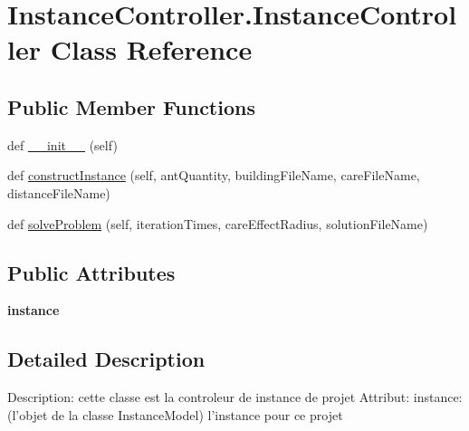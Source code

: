 \hypertarget{class_instance_controller_1_1_instance_controller}{}\section{Instance\+Controller.\+Instance\+Controller Class Reference}
\label{class_instance_controller_1_1_instance_controller}
\subsection*{Public Member Functions}
\begin{DoxyCompactItemize}
\item 
def \mbox{\hyperlink{class_instance_controller_1_1_instance_controller_a03bb3fbe1839d3b293f52105f8af0165}{\+\_\+\+\_\+init\+\_\+\+\_\+}} (self)
\item 
def \mbox{\hyperlink{class_instance_controller_1_1_instance_controller_aabe70fc23070b14aef590f99ac1c6296}{construct\+Instance}} (self, ant\+Quantity, building\+File\+Name, care\+File\+Name, distance\+File\+Name)
\item 
def \mbox{\hyperlink{class_instance_controller_1_1_instance_controller_a73f6a84881bc711978453e1af10fbb15}{solve\+Problem}} (self, iteration\+Times, care\+Effect\+Radius, solution\+File\+Name)
\end{DoxyCompactItemize}
\subsection*{Public Attributes}
\begin{DoxyCompactItemize}
\item 
\mbox{\label{class_instance_controller_1_1_instance_controller_abaec6276d2033156730519a8a7f00aba}} 
{\bfseries instance}
\end{DoxyCompactItemize}


\subsection{Detailed Description}
\begin{DoxyVerb}Description: cette classe est la controleur de instance de projet
Attribut:
    instance: (l'objet de la classe InstanceModel) l'instance pour ce projet
\end{DoxyVerb}
 

